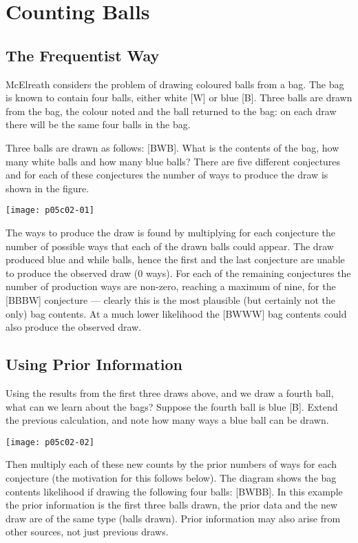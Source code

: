\section{Counting Balls}
\label{sec:CountingBalls}
\subsection{The Frequentist Way}
\label{sec:TheFrequentistWay}

McElreath \cite{McElreath2015} considers the problem of drawing coloured balls from a bag.  The bag is known to contain four balls, either white [W] or blue [B].  Three balls are drawn from the bag, the colour noted and the ball returned to the bag: on each draw there will be the same four balls in the bag.

Three balls are drawn as follows: [BWB]. What is the contents of the bag, how many white balls and how many blue balls?  There are five different conjectures and for each of these conjectures the number of ways to produce the draw is shown in the figure.
\begin{marginfigure}
\texttt{[image: p05c02-01]}
\end{marginfigure}
The ways to produce the draw is found by multiplying for each conjecture the number of possible ways that each of the drawn balls could appear.  The draw produced blue and while balls, hence the first and the last conjecture are unable to produce the observed draw (0 ways). For each of the remaining conjectures the number of production ways are non-zero, reaching a maximum of nine, for the [BBBW] conjecture --- clearly this is the most plausible (but certainly not the only) bag contents.  At a much lower likelihood the [BWWW] bag contents could also produce the observed draw.

\subsection{Using Prior Information}
\label{sec:UsingPriorInformation}

Using the results from the first three draws above, and we draw a fourth ball, what can we learn about the bags?  Suppose the fourth ball is blue [B].  Extend the previous calculation, and note how many ways a blue ball can be drawn.
\begin{marginfigure}
\texttt{[image: p05c02-02]}
\end{marginfigure}
Then multiply each of these new counts by the prior numbers of ways for each conjecture (the motivation for this follows below).  The diagram shows the bag contents likelihood if  drawing the following four balls:  [BWBB].
In this example the prior information is the first three balls drawn, the prior data and the new draw are of the same type (balls drawn).  Prior information may also arise from other sources, not just previous draws.

